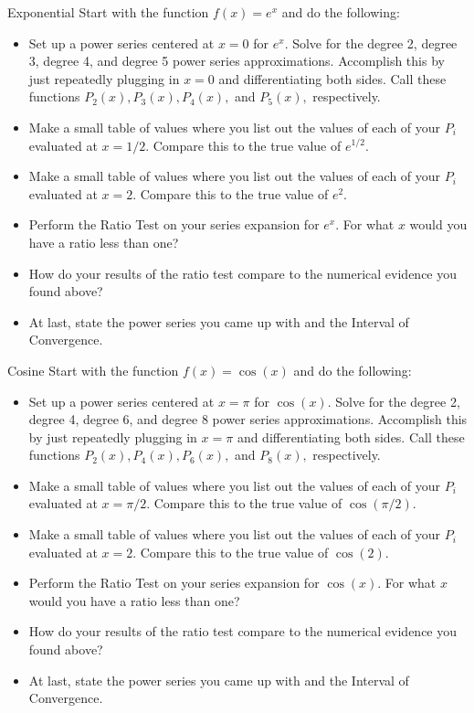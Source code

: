 \begin{exercise}{Exponential \Coffeecup \Coffeecup \Coffeecup}
Start with the function $f(x)=e^x$ and do the following:

\begin{itemize}
\item Set up a power series centered at $x=0$ for $e^x$.  Solve for the degree 2, degree 3, degree 4, and degree 5 power series approximations.  Accomplish this by just repeatedly plugging in $x=0$ and differentiating both sides.  Call these functions $P_2(x), P_3(x), P_4(x),$ and $P_5(x),$ respectively.
\item Make a small table of values where you list out the values of each of your $P_i$ evaluated at $x=1/2$.  Compare this to the true value of $e^{1/2}$.  
\item Make a small table of values where you list out the values of each of your $P_i$ evaluated at $x=2$.  Compare this to the true value of $e^2$.
\item Perform the Ratio Test on your series expansion for $e^x$.  For what $x$ would you have a ratio less than one?
\item How do your results of the ratio test compare to the numerical evidence you found above?  
\item At last, state the power series you came up with and the Interval of Convergence.
\end{itemize}
\end{exercise}

\begin{exercise}{Cosine \Coffeecup \Coffeecup \Coffeecup}
Start with the function $f(x)=\cos(x)$ and do the following:
\begin{itemize}
\item Set up a power series centered at $x=\pi$ for $\cos(x)$.  Solve for the degree 2, degree 4, degree 6, and degree 8 power series approximations.  Accomplish this by just repeatedly plugging in $x=\pi$ and differentiating both sides.  Call these functions $P_2(x), P_4(x), P_6(x),$ and $P_8(x),$ respectively.
\item Make a small table of values where you list out the values of each of your $P_i$ evaluated at $x=\pi/2$.  Compare this to the true value of $\cos\left(\pi/2\right)$.  
\item Make a small table of values where you list out the values of each of your $P_i$ evaluated at $x=2$.  Compare this to the true value of $\cos(2)$.
\item Perform the Ratio Test on your series expansion for $\cos(x)$.  For what $x$ would you have a ratio less than one?
\item How do your results of the ratio test compare to the numerical evidence you found above?  
\item At last, state the power series you came up with and the Interval of Convergence.
\end{itemize}
\end{exercise}

